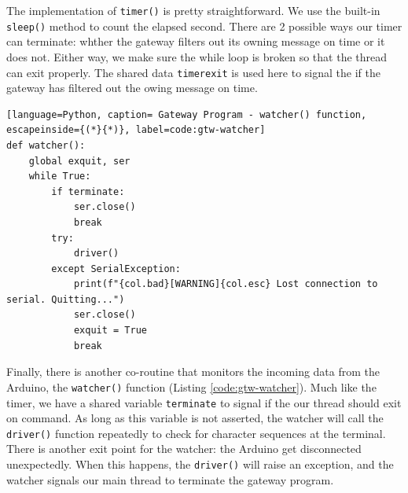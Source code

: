 The implementation of \texttt{timer()} is pretty straightforward. We use the built-in \texttt{sleep()} method to count the elapsed second. There are 2 possible ways our timer can terminate: whther the gateway filters out its owning message on time or it does not. Either way, we make sure the while loop is broken so that the thread can exit properly. The shared data \texttt{timerexit} is used here to signal the if the gateway has filtered out the owing message on time.

\begin{lstlisting}[language=Python, caption= Gateway Program - watcher() function, escapeinside={(*}{*)}, label=code:gtw-watcher]
def watcher():
    global exquit, ser
    while True:
        if terminate:
            ser.close()
            break
        try:
            driver()
        except SerialException:
            print(f"{col.bad}[WARNING]{col.esc} Lost connection to serial. Quitting...")
            ser.close()
            exquit = True
            break
\end{lstlisting}

Finally, there is another co-routine that monitors the incoming data from the Arduino, the \texttt{watcher()} function (Listing \ref{code:gtw-watcher}). Much like the timer, we have a shared variable \texttt{terminate} to signal if the our thread should exit on command. As long as this variable is not asserted, the watcher will call the \texttt{driver()} function repeatedly to check for character sequences at the terminal. There is another exit point for the watcher: the Arduino get disconnected unexpectedly. When this happens, the \texttt{driver()} will raise an exception, and the watcher signals our main thread to terminate the gateway program.

